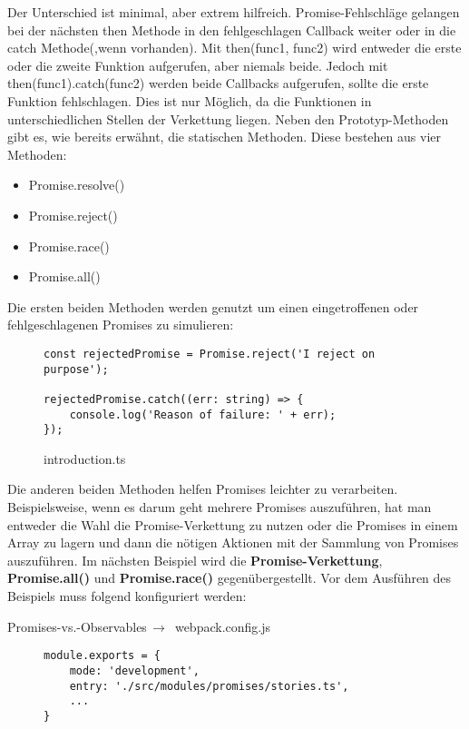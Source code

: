 \noindent
Der Unterschied ist minimal, aber extrem hilfreich. Promise-Fehlschläge gelangen bei der nächsten then Methode in den fehlgeschlagen Callback weiter oder in die catch Methode(,wenn vorhanden). Mit then(func1, func2) wird entweder die erste oder die zweite Funktion aufgerufen, aber niemals beide. Jedoch mit then(func1).catch(func2) werden beide Callbacks aufgerufen, sollte die erste Funktion fehlschlagen. Dies ist nur Möglich, da die Funktionen in unterschiedlichen Stellen der Verkettung liegen. Neben den Prototyp-Methoden gibt es, wie bereits erwähnt, die statischen Methoden. Diese bestehen aus vier Methoden:

\begin{itemize}
\item Promise.resolve()
\item Promise.reject()
\item Promise.race()
\item Promise.all()
\end{itemize}

\noindent
Die ersten beiden Methoden werden genutzt um einen eingetroffenen oder fehlgeschlagenen Promises zu simulieren:

\begin{figure}[H]
\begin{lstlisting}[basicstyle=\small]
const rejectedPromise = Promise.reject('I reject on purpose');

rejectedPromise.catch((err: string) => {
    console.log('Reason of failure: ' + err);
});
\end{lstlisting}
\caption{introduction.ts}
\end{figure}

\noindent
Die anderen beiden Methoden helfen Promises leichter zu verarbeiten. Beispielsweise, wenn es darum geht mehrere Promises auszuführen, hat man entweder die Wahl die Promise-Verkettung zu nutzen oder die Promises in einem Array zu lagern und dann die nötigen Aktionen mit der Sammlung von Promises auszuführen. Im nächsten Beispiel wird die \textbf{Promise-Verkettung}, \textbf{Promise.all()} und \textbf{Promise.race()} gegenübergestellt. Vor dem Ausführen des Beispiels muss folgend konfiguriert werden:

 \begin{center}
     Promises-vs.-Observables$\,\to\,$ webpack.config.js
 \end{center}

\begin{figure}[H]
\begin{lstlisting}[basicstyle=\small]
module.exports = {
    mode: 'development',
    entry: './src/modules/promises/stories.ts',
    ...
}
\end{lstlisting}
\end{figure}


